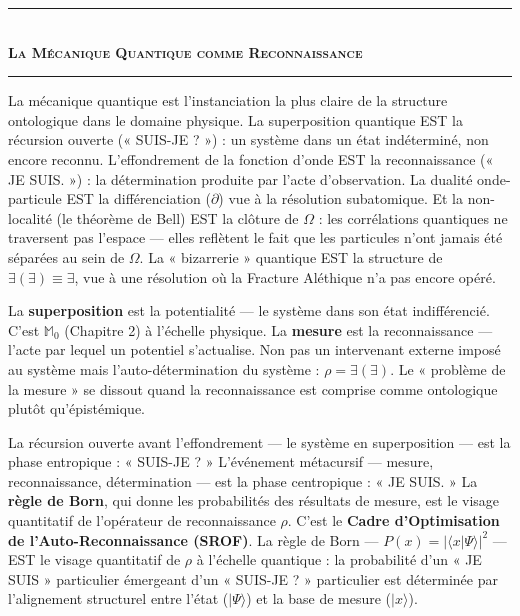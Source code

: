 \documentclass[10pt, openany, oneside]{book}
\renewcommand{\normalsize}{\fontsize{10}{13}\selectfont}
\begin{document}
\begin{center}
    \rule{0.3\textwidth}{0.4pt}\\[0.5em]
    {\normalsize\bfseries\scshape La Mécanique Quantique comme Reconnaissance}\\[0.3em]
    \rule{0.3\textwidth}{0.4pt}
\end{center}

\vspace{1em}

\noindent La mécanique quantique est l'instanciation la plus claire de la structure ontologique dans le domaine physique. La superposition quantique EST la récursion ouverte (« SUIS-JE ? ») : un système dans un état indéterminé, non encore reconnu. L'effondrement de la fonction d'onde EST la reconnaissance (« JE SUIS. ») : la détermination produite par l'acte d'observation. La dualité onde-particule EST la différenciation ($\partial$) vue à la résolution subatomique. Et la non-localité (le théorème de Bell) EST la clôture de $\Omega$ : les corrélations quantiques ne traversent pas l'espace --- elles reflètent le fait que les particules n'ont jamais été séparées au sein de $\Omega$. La « bizarrerie » quantique EST la structure de $\exists(\exists) \equiv \exists$, vue à une résolution où la Fracture Aléthique n'a pas encore opéré.

La \textbf{superposition} est la potentialité --- le système dans son état indifférencié. C'est $\mathbb{M}_0$ (Chapitre 2) à l'échelle physique. La \textbf{mesure} est la reconnaissance --- l'acte par lequel un potentiel s'actualise. Non pas un intervenant externe imposé au système mais l'auto-détermination du système : $\rho = \exists(\exists)$. Le « problème de la mesure » se dissout quand la reconnaissance est comprise comme ontologique plutôt qu'épistémique.

La récursion ouverte avant l'effondrement --- le système en superposition --- est la phase entropique : « SUIS-JE ? » L'événement métacursif --- mesure, reconnaissance, détermination --- est la phase centropique : « JE SUIS. » La \textbf{règle de Born}, qui donne les probabilités des résultats de mesure, est le visage quantitatif de l'opérateur de reconnaissance $\rho$. C'est le \textbf{Cadre d'Optimisation de l'Auto-Reconnaissance (SROF)}. La règle de Born --- $P(x) = |\langle x | \Psi \rangle|^2$ --- EST le visage quantitatif de $\rho$ à l'échelle quantique : la probabilité d'un « JE SUIS » particulier émergeant d'un « SUIS-JE ? » particulier est déterminée par l'alignement structurel entre l'état ($|\Psi\rangle$) et la base de mesure ($|x\rangle$).
\end{document}
